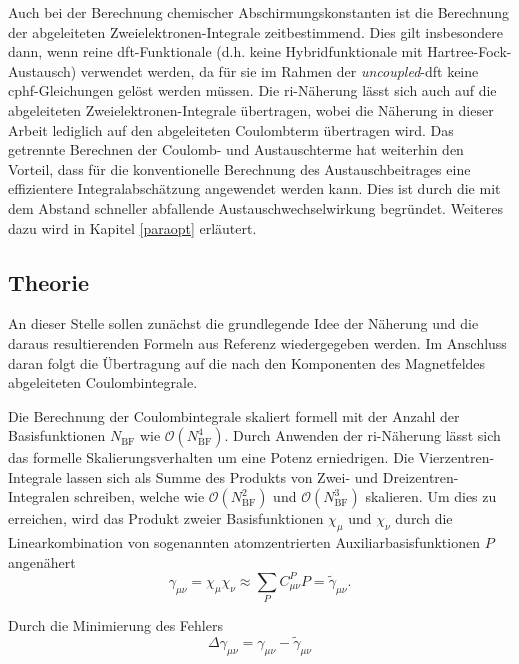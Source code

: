 Auch bei der Berechnung chemischer Abschirmungskonstanten ist die Berechnung der abgeleiteten Zweielektronen-Integrale zeitbestimmend. Dies gilt insbesondere dann, wenn reine \ac{dft}-Funktionale (d.h. keine Hybridfunktionale mit Hartree-Fock-Austausch) verwendet werden, da für sie im Rahmen der \textit{uncoupled}-\ac{dft} keine \ac{cphf}-Gleichungen gelöst werden müssen. Die \ac{ri}-Näherung lässt sich auch auf die abgeleiteten Zweielektronen-Integrale übertragen, wobei die Näherung in dieser Arbeit lediglich auf den abgeleiteten Coulombterm übertragen wird. Das getrennte Berechnen der Coulomb- und Austauschterme hat weiterhin den Vorteil, dass für die konventionelle Berechnung des Austauschbeitrages eine effizientere Integralabschätzung angewendet werden kann. Dies ist durch die mit dem Abstand schneller abfallende Austauschwechselwirkung begründet. Weiteres dazu wird in Kapitel \ref{paraopt} erläutert. 
	\subsection{Theorie}
	An dieser Stelle sollen zunächst die grundlegende Idee der Näherung und die daraus resultierenden Formeln aus Referenz \cite{vahtras1993integral} wiedergegeben werden. Im Anschluss daran folgt die Übertragung auf die nach den Komponenten des Magnetfeldes abgeleiteten Coulombintegrale. 
	
	Die Berechnung der Coulombintegrale skaliert formell mit der Anzahl der Basisfunktionen $N_\textrm{BF}$ wie $\mathcal{O}(N_\textrm{BF}^4)$. Durch Anwenden der \ac{ri}-Näherung lässt sich das formelle Skalierungsverhalten um eine Potenz erniedrigen. Die Vierzentren-Integrale lassen sich als Summe des Produkts von Zwei- und Dreizentren-Integralen schreiben, welche wie $\mathcal{O}(N_\textrm{BF}^2)$ und $\mathcal{O}(N_\textrm{BF}^3)$ skalieren. Um dies zu erreichen, wird das Produkt zweier Basisfunktionen $\chi_\mu$ und $\chi_\nu$ durch die Linearkombination von sogenannten atomzentrierten Auxiliarbasisfunktionen $P$ angenähert	
	\begin{equation}
	\gamma_{\mu\nu}=\chi_\mu\chi_\nu\approx\sum_PC^P_{\mu\nu}P=\tilde{\gamma}_{\mu\nu}.
	\end{equation}
	
	Durch die Minimierung des Fehlers
	\begin{equation}
	\Delta\gamma_{\mu\nu} = \gamma_{\mu\nu}-\tilde{\gamma}_{\mu\nu}
	\end{equation}
	
